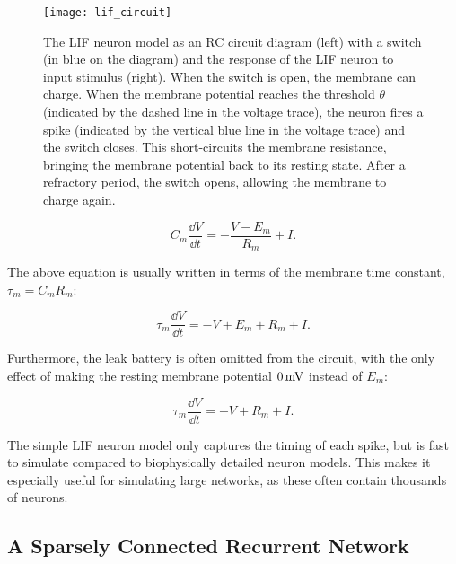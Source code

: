 \begin{figure}[!htb]
    \centering
    \texttt{[image: lif\_circuit]}
    \caption{The LIF neuron model as an RC circuit diagram (left) with a switch (in blue on the diagram) and the response of the LIF neuron to input stimulus (right). When the switch is open, the membrane can charge. When the membrane potential reaches the threshold $\theta$ (indicated by the dashed line in the voltage trace), the neuron fires a spike (indicated by the vertical blue line in the voltage trace) and the switch closes. This short-circuits the membrane resistance, bringing the membrane potential back to its resting state. After a refractory period, the switch opens, allowing the membrane to charge again.
    }
    \label{fig:lif_circuit}
\end{figure}

\begin{equation*}
    C_m \frac{\dd{V}}{\dd{t}} = - \frac{V-E_m}{R_m} + I.
\end{equation*}

The above equation is usually written in terms of the membrane time constant, $\tau_m = C_m R_m$: 

\begin{equation*}
    \tau_m \frac{\dd{V}}{\dd{t}} = - V + E_m + R_m + I.
\end{equation*}

Furthermore, the leak battery is often omitted from the circuit, with the only effect of making the resting membrane potential $0\,\mathrm{mV}$ instead of $E_m$: 

\begin{equation}\label{eq:lif_model}
    \tau_m \frac{\dd{V}}{\dd{t}} = - V + R_m + I.
\end{equation}

The simple LIF neuron model only captures the timing of each spike, but is fast to simulate compared to biophysically detailed neuron models. This makes it especially useful for simulating large networks, as these often contain thousands of neurons. 



\subsection{A Sparsely Connected Recurrent Network}

